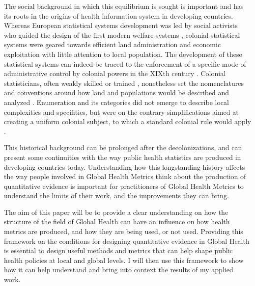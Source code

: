 The social background in which this equilibrium is sought is important and has its roots in the origins of health information system in developing countries. Whereas European statistical systems development was led by social activists who guided the design of the first modern welfare systems \citep{desrosieres_politique_1993,desrosieres_administrator_1997}, colonial statistical systems were geared towards efficient land administration and economic exploitation \citep{rambert_cartographie_1922,de_martonne_cartographie_1931} with little attention to local population. The development of these statistical systems can indeed be traced to the enforcement of a specific mode of administrative control by colonial powers in the XIXth century \citep{appadurai_number_1996,cordell_couting_2010,gervais_how_2010}.
Colonial statisticians, often weakly skilled or trained \citep{kateb_gestion_1998,cordell_couting_2010}, nonetheless set the nomenclatures and conventions around how land and populations would be described and analyzed \citep{rambert_cartographie_1922,gervais_how_2010}. Enumeration and its categories did not emerge to describe local complexities and specifities, but were on the contrary simplifications aimed at creating a uniform colonial subject, to which a standard colonial rule would apply \citep{said_orientalism_1979,appadurai_number_1996}.


This historical background can be prolonged after the decolonizations, and can present some continuities with the way public health statistics are produced in developing countries today. Understanding how this longstanding history affects the way people involved in Global Health Metrics think about the production of quantitative evidence is important for practitioners of Global Health Metrics to understand the limits of their work, and the improvements they can bring.

The aim of this paper will be to provide a clear understanding on how the structure of the field of Global Health can have an influence on how health metrics are produced, and how they are being used, or not used. Providing this framework on the conditions for designing quantitative evidence in Global Health is essential to design useful methods and metrics that can help shape public health policies at local and global levels. I will then use this framework to show how it can help understand and bring into context the results of my applied work.

